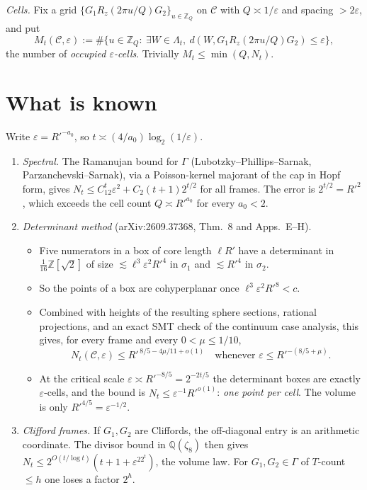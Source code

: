 \documentclass[11pt]{amsart}
\theoremstyle{remark}
\newcommand{\Z}{\mathbb Z}
\newcommand{\Q}{\mathbb Q}
\newcommand{\dproj}{d}
\begin{document}
\emph{Cells.} Fix a grid $\{G_1R_z(2\pi u/Q)G_2\}_{u\in\Z_Q}$ on $\mathcal C$ with $Q\asymp1/\varepsilon$ and spacing $>2\varepsilon$, and put
\[
M_t(\mathcal C,\varepsilon):=\#\{u\in\Z_Q:\ \exists W\in\Lambda_t,\ \dproj(W,G_1R_z(2\pi u/Q)G_2)\le\varepsilon\},
\]
the number of \emph{occupied $\varepsilon$-cells}. Trivially $M_t\le\min(Q,N_t)$.

\section{What is known}
Write $\varepsilon=R'^{-a_0}$, so $t\asymp(4/a_0)\log_2(1/\varepsilon)$.
\begin{enumerate}
\item[(R)] \emph{Spectral.} The Ramanujan bound for $\Gamma$ (Lubotzky--Phillips--Sarnak, Parzanchevski--Sarnak), via a Poisson-kernel majorant of the cap in Hopf form, gives $N_t\le C_12^t\varepsilon^2+C_2(t+1)2^{t/2}$ for all frames. The error is $2^{t/2}=R'^2$, which exceeds the cell count $Q\asymp R'^{a_0}$ for every $a_0<2$.
\item[(D)] \emph{Determinant method} (arXiv:2609.37368, Thm.~8 and Apps.~E--H).
  \begin{itemize}
  \item Five numerators in a box of core length $\ell R'$ have a determinant in $\tfrac1{16}\Z[\sqrt2]$ of size $\lesssim\ell^3\varepsilon^2R'^4$ in $\sigma_1$ and $\lesssim R'^4$ in $\sigma_2$.
  \item So the points of a box are cohyperplanar once $\ell^3\varepsilon^2R'^8<c$.
  \item Combined with heights of the resulting sphere sections, rational projections, and an exact SMT check of the continuum case analysis, this gives, for every frame and every $0<\mu\le1/10$,
  \[
  N_t(\mathcal C,\varepsilon)\le R'^{\,8/5-4\mu/11+o(1)}\quad\text{whenever }\varepsilon\le R'^{-(8/5+\mu)}.
  \]
  \item At the critical scale $\varepsilon\asymp R'^{-8/5}=2^{-2t/5}$ the determinant boxes are exactly $\varepsilon$-cells, and the bound is $N_t\le\varepsilon^{-1}R'^{o(1)}$: \emph{one point per cell}. The volume is only $R'^{4/5}=\varepsilon^{-1/2}$.
  \end{itemize}
\item[(C)] \emph{Clifford frames.} If $G_1,G_2$ are Cliffords, the off-diagonal entry is an arithmetic coordinate. The divisor bound in $\Q(\zeta_8)$ then gives $N_t\le2^{O(t/\log t)}(t+1+\varepsilon^22^t)$, the volume law. For $G_1,G_2\in\Gamma$ of $T$-count $\le h$ one loses a factor $2^h$.

\end{enumerate}
\end{document}
